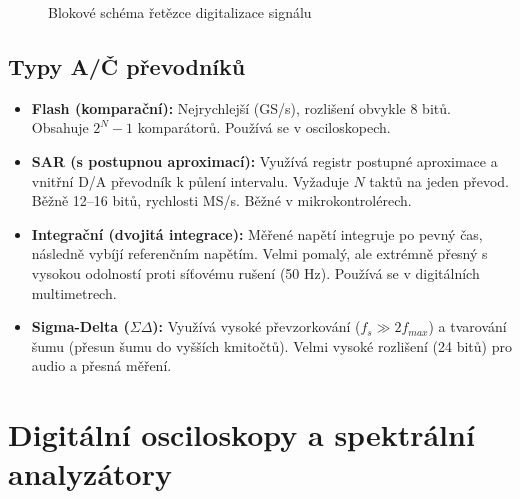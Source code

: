 \begin{figure}[h]
\centering
{}
\caption{Blokové schéma řetězce digitalizace signálu}
\label{fig:dig_chain}
\end{figure}

\subsection{Typy A/Č převodníků}
\begin{itemize}
    \item \textbf{Flash (komparační):} Nejrychlejší (GS/s), rozlišení obvykle 8 bitů. Obsahuje $2^N-1$ komparátorů. Používá se v osciloskopech.
    \item \textbf{SAR (s postupnou aproximací):} Využívá registr postupné aproximace a vnitřní D/A převodník k půlení intervalu. Vyžaduje $N$ taktů na jeden převod. Běžně 12--16 bitů, rychlosti MS/s. Běžné v mikrokontrolérech.
    \item \textbf{Integrační (dvojitá integrace):} Měřené napětí integruje po pevný čas, následně vybíjí referenčním napětím. Velmi pomalý, ale extrémně přesný s vysokou odolností proti síťovému rušení (50 Hz). Používá se v digitálních multimetrech.
    \item \textbf{Sigma-Delta ($\Sigma\Delta$):} Využívá vysoké převzorkování ($f_s \gg 2f_{max}$) a tvarování šumu (přesun šumu do vyšších kmitočtů). Velmi vysoké rozlišení (24 bitů) pro audio a přesná měření.
\end{itemize}

\section{Digitální osciloskopy a spektrální analyzátory}

